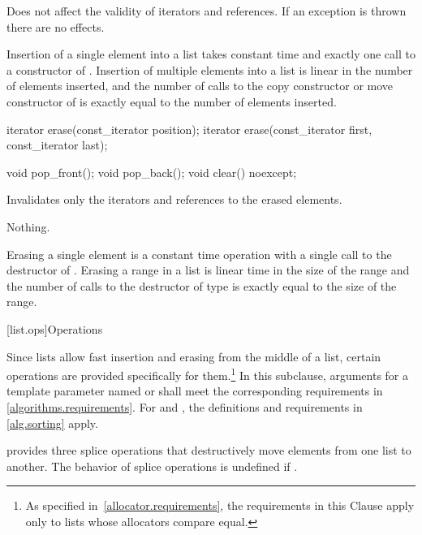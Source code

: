 \begin{itemdescr}
\pnum
\remarks
Does not affect the validity of iterators and references.
If an exception is thrown there are no effects.

\pnum
\complexity
Insertion of a single element into a list takes constant time and
exactly one call to a constructor of
. Insertion of multiple elements into a list is linear in the
number of elements inserted, and the number of calls to the copy
constructor or move constructor of  is exactly equal
to the number of elements inserted.
\end{itemdescr}

%
\begin{itemdecl}
iterator erase(const_iterator position);
iterator erase(const_iterator first, const_iterator last);

void pop_front();
void pop_back();
void clear() noexcept;
\end{itemdecl}

\begin{itemdescr}
\pnum
\effects
Invalidates only the iterators and references to the erased elements.

\pnum
\throws
Nothing.

\pnum
\complexity
Erasing a single element is a constant time operation with a single call to the destructor of
.
Erasing a range in a list is linear time in the
size of the range and the number of calls to the destructor of type
is exactly equal to the size of the range.
\end{itemdescr}

[list.ops]{Operations}

\pnum
Since lists allow fast insertion and erasing from the middle of a list, certain
operations are provided specifically for them.\footnote{As specified
in~\ref{allocator.requirements}, the requirements in this Clause apply only to
lists whose allocators compare equal.}
In this subclause,
arguments for a template parameter
named  or 
shall meet the corresponding requirements in \ref{algorithms.requirements}.
For  and ,
the definitions and requirements in \ref{alg.sorting} apply.

\pnum
{} provides three splice operations that destructively move elements from one list to
another. The behavior of splice operations is undefined if .

